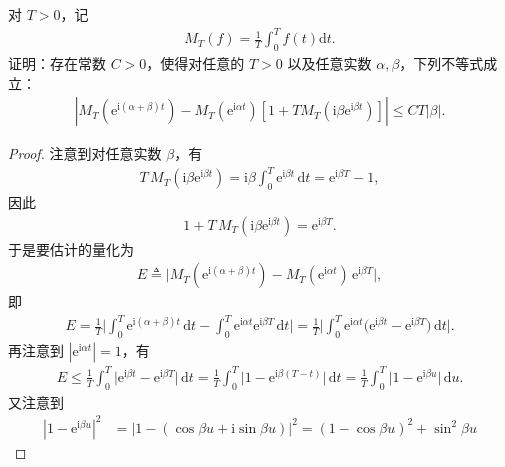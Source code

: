 \documentclass[../../main.tex]{subfiles}%
\begin{document}
\begin{example}
对 \(T > 0\)，记
\begin{align*}
M_T(f) = \frac{1}{T} \int_0^T f(t) \mathrm{d}t.
\end{align*}
证明：存在常数 \(C > 0\)，使得对任意的 \(T > 0\) 以及任意实数 \(\alpha,\beta\)，下列不等式成立：
\begin{align*}
|M_T(\mathrm{e}^{\mathrm{i}(\alpha+\beta)t}) - M_T(\mathrm{e}^{\mathrm{i}\alpha t}) [1 + T M_T(\mathrm{i}\beta \mathrm{e}^{\mathrm{i}\beta t})]| \leqslant CT|\beta|.
\end{align*}
\end{example}
\begin{proof}
注意到对任意实数 $\beta$，有
\begin{align*}
T\,M_T(\mathrm{i}\beta \mathrm{e}^{\mathrm{i}\beta t}) = \mathrm{i}\beta \int_0^T \mathrm{e}^{\mathrm{i}\beta t}\,\mathrm{d}t = \mathrm{e}^{\mathrm{i}\beta T} - 1,
\end{align*}
因此
\begin{align*}
1 + T\,M_T(\mathrm{i}\beta \mathrm{e}^{\mathrm{i}\beta t}) = \mathrm{e}^{\mathrm{i}\beta T}.
\end{align*}
于是要估计的量化为
\begin{align*}
E \triangleq \bigl| M_T(\mathrm{e}^{\mathrm{i}(\alpha+\beta)t}) - M_T(\mathrm{e}^{\mathrm{i}\alpha t})\, \mathrm{e}^{\mathrm{i}\beta T} \bigr|,
\end{align*}
即
\begin{align*}
E = \frac{1}{T}\biggl| \int_0^T \mathrm{e}^{\mathrm{i}(\alpha+\beta)t}\,\mathrm{d}t - \int_0^T \mathrm{e}^{\mathrm{i}\alpha t} \mathrm{e}^{\mathrm{i}\beta T}\,\mathrm{d}t \biggr| = \frac{1}{T}\biggl| \int_0^T \mathrm{e}^{\mathrm{i}\alpha t}\bigl(\mathrm{e}^{\mathrm{i}\beta t} - \mathrm{e}^{\mathrm{i}\beta T}\bigr)\,\mathrm{d}t \biggr|.
\end{align*}
再注意到 $|\mathrm{e}^{\mathrm{i}\alpha t}|=1$，有
\begin{align}\label{eq:111111-qaqa}
E \leqslant \frac{1}{T}\int_0^T \bigl| \mathrm{e}^{\mathrm{i}\beta t} - \mathrm{e}^{\mathrm{i}\beta T} \bigr|\,\mathrm{d}t = \frac{1}{T}\int_0^T \bigl| 1 - \mathrm{e}^{\mathrm{i}\beta (T-t)} \bigr|\,\mathrm{d}t = \frac{1}{T}\int_0^T \bigl| 1 - \mathrm{e}^{\mathrm{i}\beta u} \bigr|\,\mathrm{d}u.
\end{align}
又注意到
\begin{align*}
\left| 1-\mathrm{e}^{\mathrm{i}\beta u} \right|^2&=\left| 1-\left( \cos \beta u+\mathrm{i}\sin \beta u \right) \right|^2=\left( 1-\cos \beta u \right) ^2+\sin ^2\beta u

\end{align*}
\end{proof}
\end{document}
